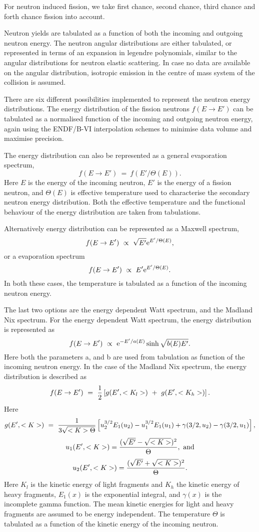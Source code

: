 For neutron induced fission, we take first chance, second chance, third chance 
and forth chance fission into account. 

Neutron yields are tabulated
as a function of both the incoming and outgoing neutron energy.
The neutron angular distributions are either tabulated, or represented in terms
of an expansion in legendre polynomials, similar to the angular distributions
for neutron elastic scattering. In case no data are available on the angular
distribution, isotropic emission in the centre of mass system of the collision
is assumed.

There are six different possibilities implemented to represent the neutron 
energy distributions. The energy distribution of the fission neutrons 
$f(E\rightarrow E')$ 
can be tabulated as a normalised 
function of the incoming and outgoing neutron energy, again using the ENDF/B-VI
interpolation schemes to minimise data volume and maximise precision. 

The energy distribution can also be represented 
as a general evaporation spectrum,
$$f(E\rightarrow E')~=~f\left(E'/\Theta(E)\right).$$
Here $E$ is the energy of the incoming neutron, $E'$ is the energy of a fission
neutron, and $\Theta(E)$ is effective temperature used to characterise the
secondary neutron energy distribution. Both the effective temperature and the
functional behaviour of the energy distribution are taken from tabulations.

Alternatively energy distribution can be represented 
as a Maxwell spectrum, $$f(E\rightarrow E')~\propto~\sqrt{E'}{\rm e}^{E'/\Theta(E)},$$
or a evaporation spectrum
$$f(E\rightarrow E')~\propto~E'{\rm e}^{E'/\Theta(E)}.$$
In both these cases, the temperature is tabulated as a function of the incoming
neutron energy.

The last two options are the energy dependent Watt spectrum, and the Madland
Nix spectrum. For the energy dependent Watt spectrum, the energy distribution
is represented as 
$$f(E\rightarrow E')~\propto~{\rm e}^{-E'/a(E)}\sinh{\sqrt{b(E)E'}}.$$
Here both the parameters a, and b are used from tabulation as function of the
incoming neutron energy.
In the case of the Madland Nix spectrum, the energy distribution is described
as
$$f(E\rightarrow E')~=~{1\over 2}\left[g(E',<K_l>)~+~g(E',<K_h>)\right].$$
Here 
$$g(E',<K>)~=~ {1\over 3\sqrt{<K>\Theta}}\left[u_2^{3/2}E_1(u_2)-u_1^{3/2}E_1(u_1)
+\gamma(3/2, u_2) - \gamma(3/2, u_1)\right],$$
$$ u_1(E',<K>) = {(\sqrt{E'}-\sqrt{<K>})^2 \over \Theta},~{\rm and}$$
$$ u_2(E',<K>) = {(\sqrt{E'}+\sqrt{<K>})^2 \over \Theta}.$$
Here $K_l$ is the kinetic energy of light fragments and $K_h$ the kinetic energy
of heavy fragments, $E_1(x)$ is the exponential integral, and $\gamma(x)$ is the
incomplete gamma function. The mean kinetic energies for light and heavy
fragments are assumed to be energy independent.
The temperature $\Theta$ is tabulated as a function of the kinetic
energy of the incoming neutron.

